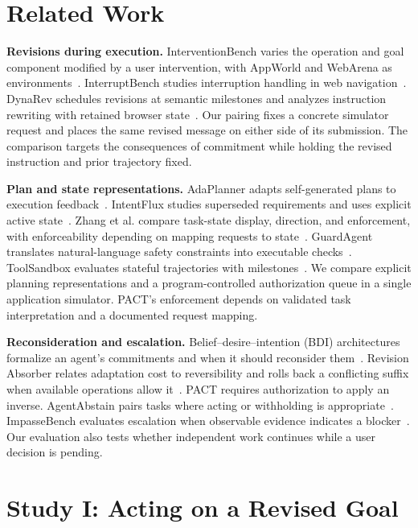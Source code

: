 \documentclass[conference]{IEEEtran}
\begin{document}
\section{Related Work}
\textbf{Revisions during execution.}
InterventionBench varies the operation and goal component modified by a user intervention, with AppWorld and WebArena as environments~\cite{lee2026intervention}. InterruptBench studies interruption handling in web navigation~\cite{zou2026interrupt}. DynaRev schedules revisions at semantic milestones and analyzes instruction rewriting with retained browser state~\cite{zhang2026dynarev}. Our pairing fixes a concrete simulator request and places the same revised message on either side of its submission. The comparison targets the consequences of commitment while holding the revised instruction and prior trajectory fixed.

\textbf{Plan and state representations.}
AdaPlanner adapts self-generated plans to execution feedback~\cite{sun2023adaplanner}. IntentFlux studies superseded requirements and uses explicit active state~\cite{zhang2026intentflux}. Zhang et al. compare task-state display, direction, and enforcement, with enforceability depending on mapping requests to state~\cite{zhang2026taskstate}. GuardAgent translates natural-language safety constraints into executable checks~\cite{xiang2025guardagent}. ToolSandbox evaluates stateful trajectories with milestones~\cite{lu2025toolsandbox}. We compare explicit planning representations and a program-controlled authorization queue in a single application simulator. PACT's enforcement depends on validated task interpretation and a documented request mapping.

\textbf{Reconsideration and escalation.}
Belief--desire--intention (BDI) architectures formalize an agent's commitments and when it should reconsider them~\cite{rao1995bdi,schut2004intention}. Revision Absorber relates adaptation cost to reversibility and rolls back a conflicting suffix when available operations allow it~\cite{zhai2026revisable}. PACT requires authorization to apply an inverse. AgentAbstain pairs tasks where acting or withholding is appropriate~\cite{liu2026abstain}. ImpasseBench evaluates escalation when observable evidence indicates a blocker~\cite{chen2026impasse}. Our evaluation also tests whether independent work continues while a user decision is pending.

\section{Study I: Acting on a Revised Goal}
\end{document}
